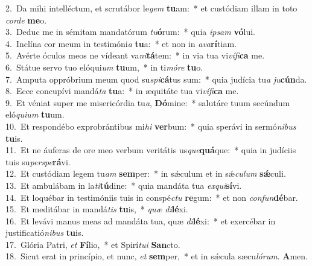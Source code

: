 {2.~}Da mihi intelléctum, et scrutábor le\textit{gem} \textbf{tu}am:~* et custódiam illam in toto \textit{cor}\textit{de} \textbf{me}o.\\
{3.~}Deduc me in sémitam mandatórum \textit{tu}\textbf{ó}rum:~* quia \textit{i}\textit{psam} \textbf{vó}lui.\\
{4.~}Inclína cor meum in testimóni\textit{a} \textbf{tu}a:~* et non in \textit{a}\textit{va}\textbf{rí}tiam.\\
{5.~}Avérte óculos meos ne vídeant va\textit{ni}\textbf{tá}tem:~* in via tua vi\textit{ví}\textit{fi}\textbf{ca} me.\\
{6.~}Státue servo tuo elóqui\textit{um} \textbf{tu}um,~* in ti\textit{mó}\textit{re} \textbf{tu}o.\\
{7.~}Amputa oppróbrium meum quod su\textit{spi}\textbf{cá}tus sum:~* quia judícia tu\textit{a} \textit{ju}\textbf{cún}da.\\
{8.~}Ecce concupívi mandá\textit{ta} \textbf{tu}a:~* in æquitáte tua vi\textit{ví}\textit{fi}\textbf{ca} me.\\
{9.~}Et véniat super me misericórdia tu\textit{a}, \textbf{Dó}mine:~* salutáre tuum secúndum eló\textit{qui}\textit{um} \textbf{tu}um.\\
{10.~}Et respondébo exprobrántibus mi\textit{hi} \textbf{ver}bum:~* quia sperávi in sermó\textit{ni}\textit{bus} \textbf{tu}is.\\
{11.~}Et ne áuferas de ore meo verbum veritátis us\textit{que}\textbf{quá}que:~* quia in judíciis tuis su\textit{per}\textit{spe}\textbf{rá}vi.\\
{12.~}Et custódiam legem tu\textit{am} \textbf{sem}per:~* in sǽculum et in sǽ\textit{cu}\textit{lum} \textbf{sǽ}culi.\\
{13.~}Et ambulábam in la\textit{ti}\textbf{tú}dine:~* quia mandáta tua \textit{ex}\textit{qui}\textbf{sí}vi.\\
{14.~}Et loquébar in testimóniis tuis in conspé\textit{ctu} \textbf{re}gum:~* et non \textit{con}\textit{fun}\textbf{dé}bar.\\
{15.~}Et meditábar in mandá\textit{tis} \textbf{tu}is,~* \textit{quæ} \textit{di}\textbf{lé}xi.\\
{16.~}Et levávi manus meas ad mandáta tua, quæ \textit{di}\textbf{lé}xi:~* et exercébar in justificatió\textit{ni}\textit{bus} \textbf{tu}is.\\
{17.~}Glória Patri, \textit{et} \textbf{Fí}lio,~* et Spirí\textit{tu}\textit{i} \textbf{San}cto.\\
{18.~}Sicut erat in princípio, et nunc, \textit{et} \textbf{sem}per,~* et in sǽcula sæcu\textit{ló}\textit{rum}. \textbf{A}men.\\
